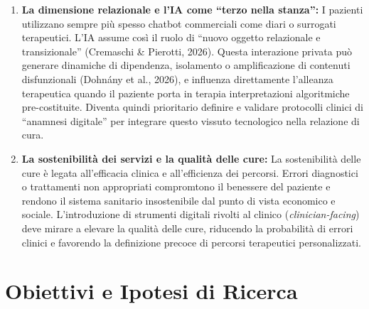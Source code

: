 \documentclass[11pt,a4paper]{article}
\begin{document}
\begin{enumerate}[label=\alph*)]
    \item \textbf{La dimensione relazionale e l'IA come ``terzo nella stanza'':} I pazienti utilizzano sempre più spesso chatbot commerciali come diari o surrogati terapeutici. L'IA assume così il ruolo di ``nuovo oggetto relazionale e transizionale'' (Cremaschi \& Pierotti, 2026). Questa interazione privata può generare dinamiche di dipendenza, isolamento o amplificazione di contenuti disfunzionali (Dohnány et al., 2026), e influenza direttamente l'alleanza terapeutica quando il paziente porta in terapia interpretazioni algoritmiche pre-costituite. Diventa quindi prioritario definire e validare protocolli clinici di ``anamnesi digitale'' per integrare questo vissuto tecnologico nella relazione di cura.
    
    \item \textbf{La sostenibilità dei servizi e la qualità delle cure:} La sostenibilità delle cure è legata all'efficacia clinica e all'efficienza dei percorsi. Errori diagnostici o trattamenti non appropriati compromtono il benessere del paziente e rendono il sistema sanitario insostenibile dal punto di vista economico e sociale. L'introduzione di strumenti digitali rivolti al clinico (\textit{clinician-facing}) deve mirare a elevare la qualità delle cure, riducendo la probabilità di errori clinici e favorendo la definizione precoce di percorsi terapeutici personalizzati.
\end{enumerate}

\section{Obiettivi e Ipotesi di Ricerca}
\end{document}
